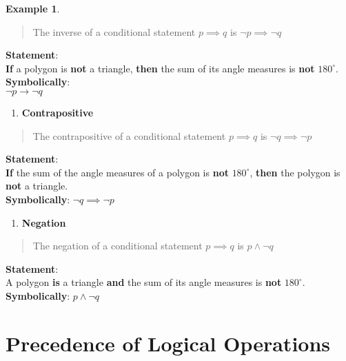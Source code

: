 \documentclass[
]{book}
\providecommand{\tightlist}{%
  \setlength{\itemsep}{0pt}\setlength{\parskip}{0pt}}
\theoremstyle{definition}
\theoremstyle{definition}
\newtheorem{example}{Example}[chapter]
\theoremstyle{definition}
\theoremstyle{definition}
\theoremstyle{remark}
\begin{document}
\begin{example}
\begin{quote}
The inverse of a conditional statement \(p \implies q\) is \(\neg p \implies \neg q\)
\end{quote}

\textbf{Statement}:\\
\textbf{If} a polygon is \textbf{not} a triangle, \textbf{then} the sum of its angle measures is \textbf{not} \(180^\circ\).\\
\textbf{Symbolically}:\\
\(\neg p \rightarrow \neg q\)

\begin{enumerate}
\def\labelenumi{(\roman{enumi})}
\setcounter{enumi}{3}
\tightlist
\item
  \textbf{Contrapositive}
\end{enumerate}

\begin{quote}
The contrapositive of a conditional statement \(p \implies q\) is \(\neg q \implies \neg p\)
\end{quote}

\textbf{Statement}:\\
\textbf{If} the sum of the angle measures of a polygon is \textbf{not} \(180^\circ\), \textbf{then} the polygon is \textbf{not} a triangle.\\
\textbf{Symbolically}: \(\neg q \implies \neg p\)

\begin{enumerate}
\def\labelenumi{(\alph{enumi})}
\setcounter{enumi}{21}
\tightlist
\item
  \textbf{Negation}
\end{enumerate}

\begin{quote}
The negation of a conditional statement \(p \implies q\) is \(p \land \neg q\)
\end{quote}

\textbf{Statement}:\\
A polygon \textbf{is} a triangle \textbf{and} the sum of its angle measures is \textbf{not} \(180^\circ\).\\
\textbf{Symbolically}: \(p \land \neg q\)

\end{example}

\section{Precedence of Logical Operations}\label{precedence-of-logical-operations}
\end{document}
